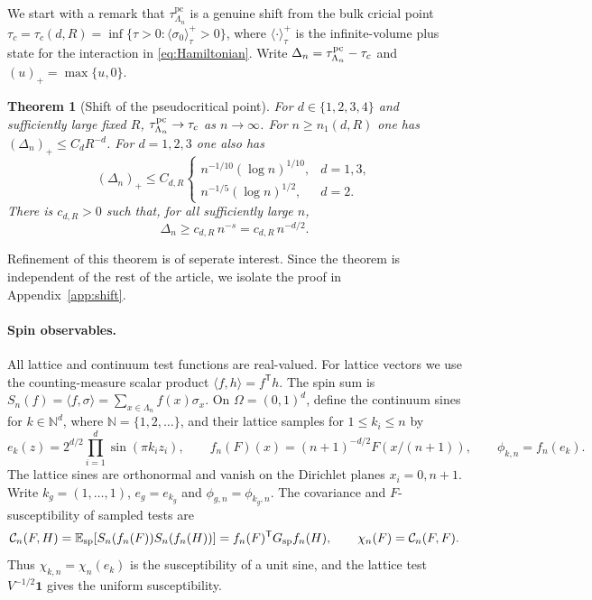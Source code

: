 \documentclass[11pt]{article}
\numberwithin{equation}{section}
\newtheorem{theorem}{Theorem}[section]
\newcommand{\E}{\mathbb E}
\newcommand{\one}{\mathbf 1}
\newcommand{\ip}[2]{\langle #1,#2\rangle}
\newcommand{\Cspin}{\mathcal C_n}
\begin{document}
We start with a remark that $\tau_{\Lambda_n}^{\mathrm{pc}}$ is a genuine shift from the
bulk cricial point 
$\tau_c=\tau_c(d,R)=\inf\{\tau>0:\langle\sigma_0\rangle_\tau^+>0\}$,
where $\langle\cdot\rangle_\tau^+$ is the infinite-volume plus state for
the interaction in \eqref{eq:Hamiltonian}. Write
$\Delta_n=\tau_{\Lambda_n}^{\rm pc}-\tau_c$ and $(u)_+=\max\{u,0\}$.

\begin{theorem}[Shift of the pseudocritical point]\label{thm:pc-shift}
For $d\in\{1,2,3,4\}$ and sufficiently large fixed $R$,
$\tau_{\Lambda_n}^{\rm pc}\to\tau_c$ as $n\to\infty$.
For $n\ge n_1(d,R)$ one has $(\Delta_n)_+\le C_dR^{-d}$.
For $d=1,2,3$ one also has
\begin{equation}\label{eq:pc-shift-upper}
 (\Delta_n)_+\le C_{d,R}
 \begin{cases}
   n^{-1/10}(\log n)^{1/10}, & d=1,3,\\
   n^{-1/5}(\log n)^{1/2}, & d=2 .
 \end{cases}
\end{equation}
There is $c_{d,R}>0$ such that, for all sufficiently large $n$,
\begin{equation}\label{eq:pc-shift}
 \Delta_n\ge c_{d,R}\,n^{-s}=c_{d,R}\,n^{-d/2}.
\end{equation}
\end{theorem}

Refinement of this theorem is of seperate interest. Since the theorem is
independent of the rest of the article, we isolate the proof in Appendix~\ref{app:shift}.


\paragraph{Spin observables.}

All lattice and continuum test functions are real-valued. For lattice
vectors we use the counting-measure scalar product
$\ip{f}{h}=f^{\mathsf T}h$. The spin sum is
$S_n(f)=\ip{f}{\sigma}=\sum_{x\in\Lambda_n} f(x)\sigma_x$.
On $\Omega = (0,1)^d$, define the continuum sines for
$k\in\mathbb N^d$, where $\mathbb N=\{1,2,\ldots\}$, and their
lattice samples for $1\le k_i\le n$ by
\begin{equation}
 e_k(z)=2^{d/2}\prod_{i=1}^d\sin(\pi k_i z_i),\qquad
 f_n(F)(x)=(n+1)^{-d/2}F(x/(n+1)),\qquad \phi_{k,n}=f_n(e_k).
\end{equation}
The lattice sines are orthonormal and vanish on the Dirichlet planes
$x_i=0,n+1$. Write $k_g=(1,\ldots,1)$, $e_g=e_{k_g}$ and
$\phi_{g,n}=\phi_{k_g,n}$. The covariance and $F$-susceptibility of
sampled tests are
\begin{equation}
 \Cspin(F,H)=\E_{\rm sp}[S_n(f_n(F))S_n(f_n(H))]
             =f_n(F)^{\mathsf T}G_{\rm sp} f_n(H),\qquad \chi_n(F)=\Cspin(F,F).
\end{equation}
Thus $\chi_{k,n}=\chi_n(e_k)$ is the susceptibility of a unit sine,
and the lattice test $V^{-1/2}\one$ gives the uniform susceptibility.
\end{document}
